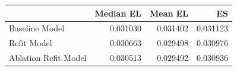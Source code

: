 \begin{tabular}{lrrr}
\toprule
 & Median EL & Mean EL & ES \\
\midrule
Baseline Model & 0.031030 & 0.031402 & 0.031123 \\
Refit Model & 0.030663 & 0.029498 & 0.030976 \\
Ablation Refit Model & 0.030513 & 0.029492 & 0.030936 \\
\bottomrule
\end{tabular}
